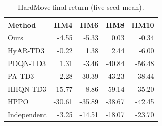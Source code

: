 \begin{table}[t]\centering\small\caption{HardMove final return (five-seed mean).}\label{tab:hmreturn}\begin{tabular}{lrrrr}\toprule Method & HM4 & HM6 & HM8 & HM10\\\midrule
Ours & -4.55 & -5.33 & 0.03 & -0.34\\ HyAR-TD3 & -0.22 & 1.38 & 2.44 & -6.00\\ PDQN-TD3 & 1.31 & -3.46 & -40.84 & -56.48\\ PA-TD3 & 2.28 & -30.39 & -43.23 & -38.44\\ HHQN-TD3 & -15.77 & -8.86 & -59.14 & -35.20\\ HPPO & -30.61 & -35.89 & -38.67 & -42.45\\ Independent & -3.25 & -14.51 & -18.07 & -23.70\\\bottomrule\end{tabular}\end{table}
